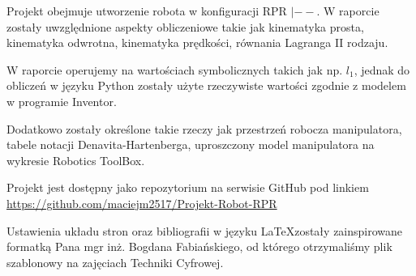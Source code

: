 Projekt obejmuje utworzenie robota w konfiguracji RPR $|--$. W raporcie zostały uwzględnione aspekty obliczeniowe takie jak kinematyka prosta, kinematyka odwrotna, kinematyka prędkości, równania Lagranga II rodzaju. 

W raporcie operujemy na wartościach symbolicznych takich jak np. $l_1$, jednak do obliczeń w języku Python\cite{Python} zostały użyte rzeczywiste wartości zgodnie z modelem w programie Inventor\cite{Inventor}.

Dodatkowo zostały określone takie rzeczy jak przestrzeń robocza manipulatora, tabele notacji Denavita-Hartenberga\cite{DH}, uproszczony model manipulatora na wykresie Robotics ToolBox\cite{Robotics_ToolBox}.

Projekt jest dostępny jako repozytorium na serwisie GitHub\cite{GitHub} pod linkiem  \url{https://github.com/maciejm2517/Projekt-Robot-RPR}

Ustawienia układu stron oraz bibliografii w języku \LaTeX zostały zainspirowane formatką Pana mgr inż. Bogdana Fabiańskiego\cite{Bogdan_Fabianski}, od którego otrzymaliśmy plik szablonowy na zajęciach Techniki Cyfrowej.